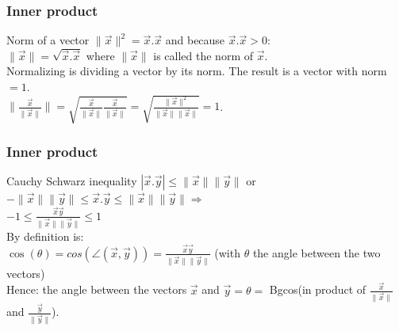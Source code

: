 \begin{frame}
	\frametitle{Inner product}
	\begin{block}{Norm of a vector}
		$\|\overrightarrow{x}\|^2=\overrightarrow{x}.\overrightarrow{x}$ and because $\overrightarrow{x}.\overrightarrow{x}>0$:\\
		$\|\overrightarrow{x}\|=\sqrt{\overrightarrow{x}.\overrightarrow{x}}$ where $\|\overrightarrow{x}\|$ is called the norm of $\overrightarrow{x}$.\\
		Normalizing is dividing a vector by its norm. The result is a vector with norm $=1$.\\
		$\|\frac{\overrightarrow{x}}{\|\overrightarrow{x}\|}\|= \sqrt{\frac{\overrightarrow{x}}{\|\overrightarrow{x}\|} \frac{\overrightarrow{x}}{\|\overrightarrow{x}\|}}= \sqrt{\frac{\|\overrightarrow{x}\|^2}{\|\overrightarrow{x}\|\|\overrightarrow{x}\|}}=1$.
	\end{block} 
\end{frame}

\begin{frame}
	\frametitle{Inner product}
	\begin{block}{Cauchy Schwarz inequality}
		$|\overrightarrow{x}.\overrightarrow{y}|\leq \|\overrightarrow{x}\|\|\overrightarrow{y}\|$ or \\
		$-\|\overrightarrow{x}\|\|\overrightarrow{y}\|\leq \overrightarrow{x}.\overrightarrow{y}\leq \|\overrightarrow{x}\|\|\overrightarrow{y}\| \Rightarrow$ \\
		$-1 \leq\frac{\overrightarrow{x}\overrightarrow{y}} {\|\overrightarrow{x}\|\|\overrightarrow{y}\|} \leq 1$\\
		By definition is:\\
		$\cos(\theta)=cos(\angle (\overrightarrow{x}, \overrightarrow{y}))= \frac{\overrightarrow{x}\overrightarrow{y}} {\|\overrightarrow{x}\|\|\overrightarrow{y}\|}$ (with $\theta$ the angle between the two vectors)\\
		Hence: the angle between the vectors $\overrightarrow{x}$ and $\overrightarrow{y}=\theta=$ Bgcos(in product of $\frac{\overrightarrow{x}}{\|\overrightarrow{x}\|}$ and $\frac{\overrightarrow{y}}{\|\overrightarrow{y}\|}$).
	\end{block} 
\end{frame}

